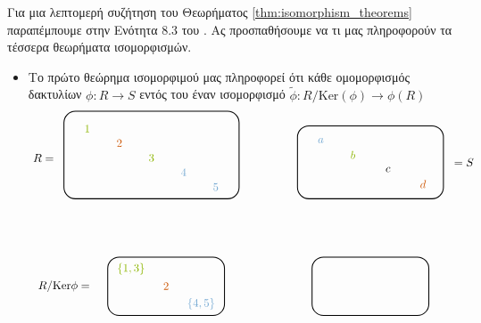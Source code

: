 \documentclass[12pt,a4paper,reqno]{amsart}
\makeatletter
\theoremstyle{definition}
\theoremstyle{remark}
\numberwithin{theorem}{section}
\numberwithin{exercise}{section}
\numberwithin{equation}{section}
\renewcommand{\to}{\rightarrow}
\newcommand{\rmKer}{\mathrm{Ker}}
\def\mathcolor#1#{\@mathcolor{#1}}
\def\@mathcolor#1#2#3{%
  \protect\leavevmode
  \begingroup
    \color#1{#2}#3%
  \endgroup
}
\makeatother
\begin{document}
Για μια λεπτομερή συζήτηση του Θεωρήματος \ref{thm:isomorphism_theorems} παραπέμπουμε στην Ενότητα 8.3 του \cite{Mpe15}. Ας προσπαθήσουμε να  τι μας πληροφορούν τα τέσσερα θεωρήματα ισομορφισμών.
\begin{itemize}
    \item Το πρώτο θεώρημα ισομορφιμού μας πληροφορεί ότι κάθε ομομορφισμός δακτυλίων $\phi : R \to S$  εντός του έναν ισομορφισμό $\tilde{\phi} : R/\rmKer(\phi) \to \phi(R)$
    \[
    \begin{tikzpicture}[>=stealth,scale=.9]

    \begin{scope}[shift={(0,4)}]
    \draw[rounded corners=10pt, thick] (0,0) rectangle (6,3);

    \node at (0.8,2.4) {$\mathcolor{applegreen}{1}$};
    \node at (1.9,1.9) {$\mathcolor{burntorange}{2}$};
    \node at (3.0,1.4) {$\mathcolor{applegreen}{3}$};
    \node at (-.7,1.4) {$R =$};
    \node at (4.1,0.9) {$\mathcolor{iceberg}{4}$};
    \node at (5.2,0.4) {$\mathcolor{iceberg}{5}$};
    \end{scope}

    \begin{scope}[shift={(8,4)}]
    \draw[rounded corners=10pt, thick] (0,0) rectangle (5,2.5);

    \node at (0.8,2.0) {$\mathcolor{iceberg}{a}$};
    \node at (1.9,1.5) {$\mathcolor{applegreen}{b}$};
    \node at (5.7,1.25) {$= S$};
    \node at (3.1,1.0) {$c$};
    \node at (4.3,0.5) {$\mathcolor{burntorange}{d}$};
    \end{scope}

    \begin{scope}[shift={(1.5,0)}]
    \draw[rounded corners=10pt, thick] (0,0) rectangle (4,2);

    \node at (0.8,1.6) {$\mathcolor{applegreen}{\{1,3\}}$};
    \node at (2.0,1.0) {$\mathcolor{burntorange}{2}$};
    \node at (-1.5,1.0) {$R/\rmKer\phi =$};
    \node at (3.2,0.4) {$\mathcolor{iceberg}{\{4,5\}}$};
    \end{scope}

    \begin{scope}[shift={(8.5,0)}]
    \draw[rounded corners=10pt, thick] (0,0) rectangle (4,2);


\end{scope}
\end{tikzpicture}\]
\end{itemize}
\end{document}
